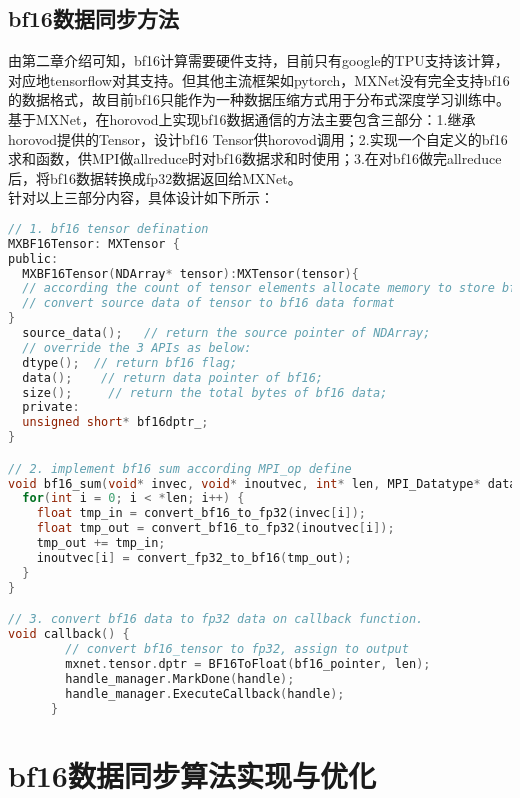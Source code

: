 \subsection{bf16数据同步方法}
由第二章介绍可知，bf16计算需要硬件支持，目前只有google的TPU支持该计算，对应地tensorflow对其支持。但其他主流框架如pytorch，MXNet没有完全支持bf16的数据格式，故目前bf16只能作为一种数据压缩方式用于分布式深度学习训练中。基于MXNet，在horovod上实现bf16数据通信的方法主要包含三部分：1.继承horovod提供的Tensor，设计bf16 Tensor供horovod调用；2.实现一个自定义的bf16求和函数，供MPI做allreduce时对bf16数据求和时使用；3.在对bf16做完allreduce后，将bf16数据转换成fp32数据返回给MXNet。\\
针对以上三部分内容，具体设计如下所示：
\begin{lstlisting}[language=C, numbers=none]
// 1. bf16 tensor defination
MXBF16Tensor: MXTensor {
public:
  MXBF16Tensor(NDArray* tensor):MXTensor(tensor){
  // according the count of tensor elements allocate memory to store bf16 data;
  // convert source data of tensor to bf16 data format
}
  source_data();   // return the source pointer of NDArray;
  // override the 3 APIs as below:
  dtype();  // return bf16 flag;
  data();    // return data pointer of bf16;
  size();     // return the total bytes of bf16 data;
  private:
  unsigned short* bf16dptr_;
}

// 2. implement bf16 sum according MPI_op define
void bf16_sum(void* invec, void* inoutvec, int* len, MPI_Datatype* datatype) {
  for(int i = 0; i < *len; i++) {
    float tmp_in = convert_bf16_to_fp32(invec[i]);
    float tmp_out = convert_bf16_to_fp32(inoutvec[i]);
    tmp_out += tmp_in;
    inoutvec[i] = convert_fp32_to_bf16(tmp_out);
  }
}

// 3. convert bf16 data to fp32 data on callback function.
void callback() {
        // convert bf16_tensor to fp32, assign to output
        mxnet.tensor.dptr = BF16ToFloat(bf16_pointer, len);
        handle_manager.MarkDone(handle);
        handle_manager.ExecuteCallback(handle);
      }
\end{lstlisting}
\section{bf16数据同步算法实现与优化}

